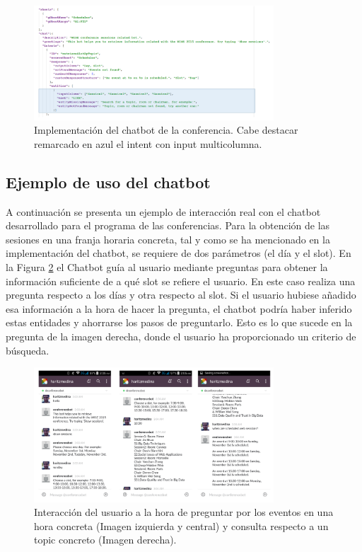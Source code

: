 \begin{figure}[htb]
	\centering
	\includegraphics[width=0.8\textwidth]{./figs/DSLConference.png}
	\caption{Implementación del chatbot de la conferencia. Cabe destacar remarcado en azul el intent con input multicolumna.}
	\label{fig:DSLConference}
\end{figure}

\subsection{Ejemplo de uso del chatbot}

A continuación se presenta un ejemplo de interacción real con el chatbot desarrollado para el programa de las conferencias. Para la obtención de las sesiones en una franja horaria concreta, tal y como se ha mencionado en la implementación del chatbot, se requiere de dos parámetros (el día y el slot). En la Figura \ref{fig:EjecucionConference} el Chatbot guía al usuario mediante preguntas para obtener la información suficiente de a qué slot se refiere el usuario. En este caso realiza una pregunta respecto a los días y otra respecto al slot. Si el usuario hubiese añadido esa información a la hora de hacer la pregunta, el chatbot podría haber inferido estas entidades y ahorrarse los pasos de preguntarlo. Esto es lo que sucede en la pregunta de la imagen derecha, donde el usuario ha proporcionado un criterio de búsqueda.

\begin{figure}[htb]
	\centering
	\includegraphics[width=0.8\textwidth]{./figs/EjecucionConferencia.png}
	\caption{Interacción del usuario a la hora de preguntar por los eventos en una hora concreta (Imagen izquierda y central) y consulta respecto a un topic concreto (Imagen derecha).}
	\label{fig:EjecucionConference}
\end{figure}


